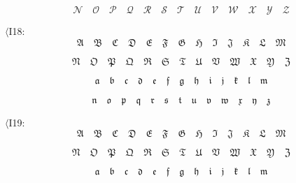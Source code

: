 \documentclass{book}
\begin{document}
$$\mathbf{\mathcal{N}}\quad \mathbf{\mathcal{O}}\quad \mathbf{\mathcal{P}}\quad
	\mathbf{\mathcal{Q}}\quad \mathbf{\mathcal{R}}\quad \mathbf{\mathcal{S}}\quad \mathbf{\mathcal{T}}\quad
	\mathbf{\mathcal{U}}\quad \mathbf{\mathcal{V}}\quad \mathbf{\mathcal{W}}\quad \mathbf{\mathcal{X}}\quad
	\mathbf{\mathcal{Y}}\quad \mathbf{\mathcal{Z}}$$

$\langle$I18:
$$\mathfrak{A}\quad \mathfrak{B}\quad \mathfrak{C}\quad \mathfrak{D}\quad
	\mathfrak{E}\quad \mathfrak{F}\quad \mathfrak{G}\quad \mathfrak{H}\quad
	\mathfrak{I}\quad \mathfrak{J}\quad \mathfrak{K}\quad \mathfrak{L}\quad
	\mathfrak{M}$$

$$\mathfrak{N}\quad \mathfrak{O}\quad \mathfrak{P}\quad
	\mathfrak{Q}\quad \mathfrak{R}\quad \mathfrak{S}\quad \mathfrak{T}\quad
	\mathfrak{U}\quad \mathfrak{V}\quad \mathfrak{W}\quad \mathfrak{X}\quad
	\mathfrak{Y}\quad \mathfrak{Z}$$

$$\mathfrak{a}\quad \mathfrak{b}\quad
	\mathfrak{c}\quad \mathfrak{d}\quad \mathfrak{e}\quad \mathfrak{f}\quad
	\mathfrak{g}\quad \mathfrak{h}\quad \mathfrak{i}\quad \mathfrak{j}\quad
	\mathfrak{k}\quad \mathfrak{l}\quad \mathfrak{m}$$

$$\mathfrak{n}\quad
	\mathfrak{o}\quad \mathfrak{p}\quad \mathfrak{q}\quad \mathfrak{r}\quad
	\mathfrak{s}\quad \mathfrak{t}\quad \mathfrak{u}\quad \mathfrak{v}\quad
	\mathfrak{w}\quad \mathfrak{x}\quad \mathfrak{y}\quad \mathfrak{z}$$

$\langle$I19:
\[\mathbf{\mathfrak{A}}\quad \mathbf{\mathfrak{B}}\quad \mathbf{\mathfrak{C}}\quad \mathbf{\mathfrak{D}}\quad
	\mathbf{\mathfrak{E}}\quad \mathbf{\mathfrak{F}}\quad \mathbf{\mathfrak{G}}\quad \mathbf{\mathfrak{H}}\quad
	\mathbf{\mathfrak{I}}\quad \mathbf{\mathfrak{J}}\quad \mathbf{\mathfrak{K}}\quad \mathbf{\mathfrak{L}}\quad
	\mathbf{\mathfrak{M}}\]

\[\mathbf{\mathfrak{N}}\quad \mathbf{\mathfrak{O}}\quad \mathbf{\mathfrak{P}}\quad
	\mathbf{\mathfrak{Q}}\quad \mathbf{\mathfrak{R}}\quad \mathbf{\mathfrak{S}}\quad \mathbf{\mathfrak{T}}\quad
	\mathbf{\mathfrak{U}}\quad \mathbf{\mathfrak{V}}\quad \mathbf{\mathfrak{W}}\quad \mathbf{\mathfrak{X}}\quad
	\mathbf{\mathfrak{Y}}\quad \mathbf{\mathfrak{Z}}\]

\[\mathbf{\mathfrak{a}}\quad \mathbf{\mathfrak{b}}\quad
	\mathbf{\mathfrak{c}}\quad \mathbf{\mathfrak{d}}\quad \mathbf{\mathfrak{e}}\quad \mathbf{\mathfrak{f}}\quad
	\mathbf{\mathfrak{g}}\quad \mathbf{\mathfrak{h}}\quad \mathbf{\mathfrak{i}}\quad \mathbf{\mathfrak{j}}\quad
	\mathbf{\mathfrak{k}}\quad \mathbf{\mathfrak{l}}\quad \mathbf{\mathfrak{m}}\]
\end{document}
